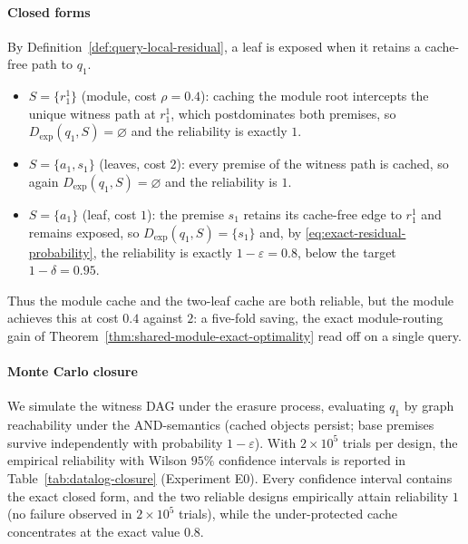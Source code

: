 \documentclass[journal]{IEEEtran}
\numberwithin{equation}{section}
\begin{document}
\paragraph*{Closed forms}
By Definition~\ref{def:query-local-residual}, a leaf is exposed when it
retains a cache-free path to \(q_{1}\).
\begin{itemize}[leftmargin=5mm]
\item \(S=\{r_{1}^{1}\}\) (module, cost \(\rho=0.4\)): caching the module root
intercepts the unique witness path at \(r_{1}^{1}\), which postdominates both
premises, so \(D_{\mathrm{exp}}(q_{1},S)=\varnothing\) and the reliability is
exactly \(1\).
\item \(S=\{a_{1},s_{1}\}\) (leaves, cost \(2\)): every premise of the
witness path is cached, so again \(D_{\mathrm{exp}}(q_{1},S)=\varnothing\)
and the reliability is \(1\).
\item \(S=\{a_{1}\}\) (leaf, cost \(1\)): the premise \(s_{1}\) retains its
cache-free edge to \(r_{1}^{1}\) and remains exposed, so
\(D_{\mathrm{exp}}(q_{1},S)=\{s_{1}\}\) and, by
\eqref{eq:exact-residual-probability}, the reliability is exactly
\(1-\varepsilon=0.8\), below the target \(1-\delta=0.95\).
\end{itemize}
Thus the module cache and the two-leaf cache are both reliable, but the
module achieves this at cost \(0.4\) against \(2\): a five-fold saving, the
exact module-routing gain of
Theorem~\ref{thm:shared-module-exact-optimality} read off on a single
query.

\paragraph*{Monte Carlo closure}
We simulate the witness DAG under the erasure process, evaluating \(q_{1}\)
by graph reachability under the AND-semantics (cached objects persist; base
premises survive independently with probability \(1-\varepsilon\)).  With
\(2\times10^{5}\) trials per design, the empirical reliability with Wilson
\(95\%\) confidence intervals is reported in
Table~\ref{tab:datalog-closure} (Experiment E0).  Every confidence interval contains the
exact closed form, and the two reliable designs empirically attain
reliability \(1\) (no failure observed in \(2\times10^{5}\) trials), while
the under-protected cache concentrates at the exact value \(0.8\).
\end{document}
